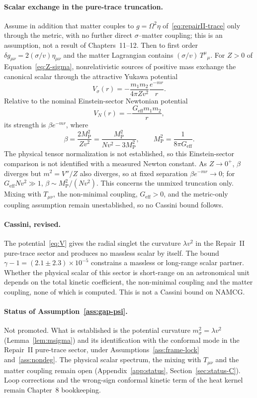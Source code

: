\paragraph{Scalar exchange in the pure-trace truncation.}
Assume in addition that matter couples to \(g=\Omega^{2}\eta\)
of~\eqref{eq:repairII-trace} only through the metric, with no further
direct \(\sigma\)--matter coupling; this is an assumption, not a result
of Chapters~11--12. Then to first order
\(\delta g_{\mu\nu}=2(\sigma/v)\eta_{\mu\nu}\) and the matter
Lagrangian contains \((\sigma/v)\,T^{\mu}{}_{\mu}\). For \(Z>0\) of
Equation~\eqref{eq:Z-sigma}, nonrelativistic sources of positive mass
exchange the canonical scalar through the attractive Yukawa potential
\[
  V_\sigma(r)=-\frac{m_1m_2}{4\pi Z v^{2}}\frac{e^{-mr}}{r}.
\]
Relative to the nominal Einstein-sector Newtonian potential
\[
  V_N(r)=-\frac{G_{\mathrm{eff}}m_1m_2}{r},
\]
its strength is \(\beta e^{-mr}\), where
\[
  \beta=\frac{2M_{\mathrm P}^{2}}{Zv^{2}}
  =\frac{M_{\mathrm P}^{2}}{Nv^{2}-3M_{\mathrm P}^{2}},
  \qquad M_{\mathrm P}^{2}=\frac1{8\pi G_{\mathrm{eff}}}.
\]
The physical tensor normalization is not established, so this
Einstein-sector comparison is not identified with a measured Newton
constant. As \(Z\to0^{+}\), \(\beta\) diverges but
\(m^{2}=V''/Z\) also diverges, so at fixed separation
\(\beta e^{-mr}\to0\); for \(G_{\mathrm{eff}}Nv^{2}\gg1\),
\(\beta\sim M_{\mathrm P}^{2}/(Nv^{2})\). This concerns the unmixed
truncation only. Mixing with \(T_{\mu\nu}\), the non-minimal coupling,
\(G_{\mathrm{eff}}>0\), and the metric-only coupling assumption remain
unestablished, so no Cassini bound follows.

\paragraph{Cassini, revised.}
The potential~\eqref{eq:V} gives the radial singlet the curvature
\(\lambda v^{2}\) in the Repair~II pure-trace sector and produces no
massless scalar by itself. The bound
\(\gamma-1=(2.1\pm 2.3)\times 10^{-5}\)
\cite{Bertotti2003}
constrains a massless or long-range scalar partner. Whether the
physical scalar of this sector is short-range on an astronomical
unit depends on the total kinetic coefficient, the non-minimal
coupling and the matter coupling, none of which is computed. This is
not a Cassini bound on NAMCG.

\paragraph{Status of Assumption~\ref{ass:gap-psi}.}
Not promoted. What is established is the potential curvature
\(m_\sigma^{2}=\lambda v^{2}\) (Lemma~\ref{lem:msigma}) and its
identification with the conformal mode in the Repair~II pure-trace
sector, under Assumptions~\ref{ass:frame-lock} and~\ref{ass:nondeg}.
The physical scalar spectrum, the mixing with \(T_{\mu\nu}\) and the
matter coupling remain open (Appendix~\ref{app:status},
Section~\ref{sec:status-C}). Loop corrections and the wrong-sign
conformal kinetic term of the heat kernel remain Chapter~8
bookkeeping.


